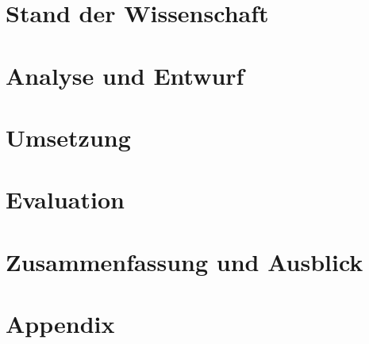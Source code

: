 \documentclass[
	12pt,
	BCOR=10mm,
	listof=totoc,
	bibliography=totoc
	]
{scrbook} %
\begin{document}
\chapter{Stand der Wissenschaft}
\label{ch:state-art}
 	

\chapter{Analyse und Entwurf}
\label{ch:probs-obs-procs}
 	
 	
\chapter{Umsetzung}
\label{ch:realisation}
 	

 	
\chapter{Evaluation}
\label{ch:summ-eva-outl}
 	
 	
\chapter{Zusammenfassung und Ausblick}
\label{ch:summ-eva-outl}
 	


\twocolumn 


\onecolumn
\appendix 	
\chapter{Appendix}
\label{ch:appendix}
 	 
\end{document}
